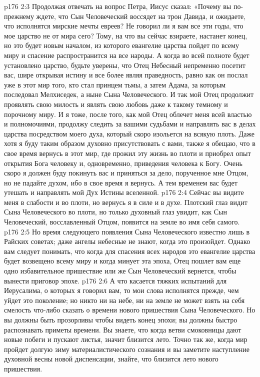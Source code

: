 \vs p176 2:3 \pc Продолжая отвечать на вопрос Петра, Иисус сказал: «Почему вы по\hyp{}прежнему ждете, что Сын Человеческий воссядет на трон Давида, и ожидаете, что исполнятся мирские мечты евреев? Не говорил ли я вам все эти годы, что мое царство не от мира сего? Тому, на что вы сейчас взираете, настанет конец, но это будет новым началом, из которого евангелие царства пойдет по всему миру и спасение распространится на все народы. А когда во всей полноте будет установлено царство, будьте уверены, что Отец Небесный непременно посетит вас, шире открывая истину и все более являя праведность, равно как он послал уже в этот мир того, кто стал принцем тьмы, а затем Адама, за которым последовал Мелхиседек, а ныне Сына Человеческого. И так мой Отец продолжит проявлять свою милость и являть свою любовь даже к такому темному и порочному миру. И я тоже, после того, как мой Отец облечет меня всей властью и полномочиями, продолжу следить за вашими судьбами и направлять вас в делах царства посредством моего духа, который скоро изольется на всякую плоть. Даже хотя я буду таким образом духовно присутствовать с вами, также я обещаю, что в свое время вернусь в этот мир, где прожил эту жизнь во плоти и приобрел опыт открытия Бога человеку и, одновременно, приведения человека к Богу. Очень скоро я должен буду покинуть вас и приняться за дело, порученное мне Отцом, но не падайте духом, ибо в свое время я вернусь. А тем временем вас будет утешать и направлять мой Дух Истины вселенной.
\vs p176 2:4 Сейчас вы видите меня в слабости и во плоти, но вернусь я в силе и в духе. Плотский глаз видит Сына Человеческого во плоти, но только духовный глаз увидит, как Сын Человеческий, восславленный Отцом, появится на земле во имя себя самого.
\vs p176 2:5 Но время следующего появления Сына Человеческого известно лишь в Райских советах; даже ангелы небесные не знают, когда это произойдет. Однако вам следует понимать, что когда для спасения всех народов это евангелие царства будет возвещено всему миру и когда минует эта эпоха, Отец пошлет вам еще одно избавительное пришествие или же Сын Человеческий вернется, чтобы вынести приговор эпохе.
\vs p176 2:6 А что касается тяжких испытаний для Иерусалима, о которых я говорил вам, то мои слова исполнятся прежде, чем уйдет это поколение; но никто ни на небе, ни на земле не может взять на себя смелость что\hyp{}либо сказать о времени нового пришествия Сына Человеческого. Но вы должны быть прозорливы чтобы видеть конец эпохи; вы должны быстро распознавать приметы времени. Вы знаете, что когда ветви смоковницы дают новые побеги и пускают листья, значит близится лето. Точно так же, когда мир пройдет долгую зиму материалистического сознания и вы заметите наступление духовной весны новой диспенсации, знайте, что близится лето нового пришествия.
